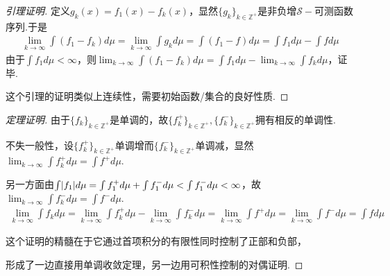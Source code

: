\begin{proof}[引理证明]
    定义\(g_k(x)=f_1(x)-f_k(x)\)，显然\(\{g_k\}_{k \in \mathbb{Z}^+}\)是非负增\(\mathcal{S}-\)可测函数序列.于是
    \begin{align*}
        \lim_{k \to \infty} \int (f_1-f_k) d\mu=\lim_{k \to \infty} \int g_k d\mu=\int (f_1-f) d\mu=\int f_1 d\mu-\int f d\mu
    \end{align*}
    由于\(\int f_1 d\mu<\infty\)，则\(\lim_{k \to \infty} \int (f_1-f_k) d\mu=\int f_1 d\mu-\lim_{k \to \infty} \int f_k d\mu\)，证毕.

    {\kaishu 这个引理的证明类似上连续性，需要初始函数/集合的良好性质.}
\end{proof}

\begin{proof}[定理证明]
    由于\(\{f_k\}_{k \in \mathbb{Z}^+}\)是单调的，故\(\{f_k^+\}_{k \in \mathbb{Z}^+}, \{f_k^-\}_{k \in \mathbb{Z}^+}\){\kaishu 拥有相反的单调性}.

    不失一般性，设\(\{f_k^+\}_{k \in \mathbb{Z}^+}\)单调增而\(\{f_k^-\}_{k \in \mathbb{Z}^+}\)单调减，显然\(\lim_{k \to \infty} \int f_k^+ d\mu=\int f^+ d\mu\).

    另一方面由\(\int \abs*{f_1} d\mu=\int f_1^+d\mu+\int f_1^- d\mu<\int f_1^- d\mu<\infty\)，故\(\lim_{k \to \infty} \int f_k^- d\mu=\int f^- d\mu\).
    \begin{align*}
        \lim_{k \to \infty} \int f_k d\mu=\lim_{k \to \infty} \int f_k^+ d\mu-\lim_{k \to \infty} \int f_k^- d\mu
        =\lim_{k \to \infty} \int f^+ d\mu=\lim_{k \to \infty} \int f^- d\mu=\int f d\mu
    \end{align*}
    {\kaishu 这个证明的精髓在于它通过首项积分的有限性同时控制了正部和负部，
    
    形成了一边直接用单调收敛定理，另一边用可积性控制的对偶证明.}
\end{proof}